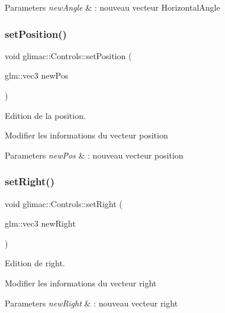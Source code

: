 \begin{DoxyParams}{Parameters}
{\em new\+Angle} & \+: nouveau vecteur Horizontal\+Angle \\
\hline
\end{DoxyParams}
\mbox{\label{classglimac_1_1Controls_a106c6381601ce5aace8ffdc0b4b7dd95}} 
\subsubsection{\texorpdfstring{set\+Position()}{setPosition()}}
{\footnotesize\ttfamily void glimac\+::\+Controls\+::set\+Position (\begin{DoxyParamCaption}\item[{glm\+::vec3}]{new\+Pos }\end{DoxyParamCaption})}



Edition de la position. 

Modifier les informations du vecteur position


\begin{DoxyParams}{Parameters}
{\em new\+Pos} & \+: nouveau vecteur position \\
\hline
\end{DoxyParams}
\mbox{\label{classglimac_1_1Controls_ae42a699a28d327cd7c9e1d01e78ae693}} 
\subsubsection{\texorpdfstring{set\+Right()}{setRight()}}
{\footnotesize\ttfamily void glimac\+::\+Controls\+::set\+Right (\begin{DoxyParamCaption}\item[{glm\+::vec3}]{new\+Right }\end{DoxyParamCaption})}



Edition de right. 

Modifier les informations du vecteur right


\begin{DoxyParams}{Parameters}
{\em new\+Right} & \+: nouveau vecteur right \\
\hline
\end{DoxyParams}
\mbox{\label{classglimac_1_1Controls_abdd360d577810fddb2f01a96dc5baacc}} 
